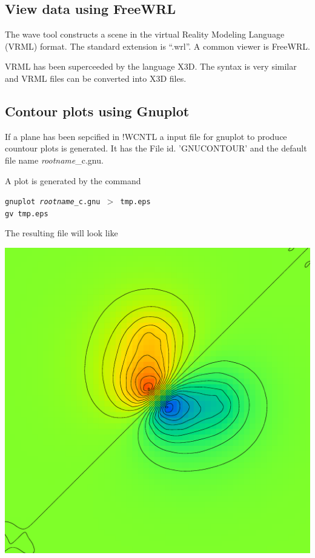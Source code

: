 \documentclass[final,12pt]{article}
\begin{document}
{{{{\subsection{View data using FreeWRL}
The wave tool constructs a scene in the virtual Reality Modeling
Language (VRML) format. The standard extension is ``.wrl''. A common
viewer is FreeWRL.

VRML has been superceeded by the language X3D. The syntax is very
similar and VRML files can be converted into X3D files.

\newpage
\subsection{Contour plots using Gnuplot}
If a plane has been sepcified in !WCNTL a input file for gnuplot to
produce countour plots is generated. It has the File id. 'GNUCONTOUR'
and the default file name \textit{rootname}\_c.gnu.

A plot is generated by the command
\begin{center}
\begin{minipage}{0.7\linewidth}
{\tt gnuplot {\it rootname}\_c.gnu $>$ tmp.eps}\\
{\tt gv tmp.eps}
\end{minipage}
\end{center}

The resulting file will look like
\begin{center}
\includegraphics[width=0.5\linewidth,clip=true]{Figs/gnucontour.eps}
\end{center}


}}}}
\end{document}
